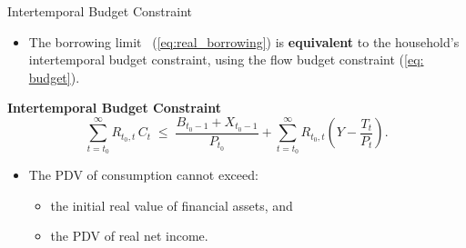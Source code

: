 \documentclass[11pt,aspectratio=169]{beamer}
\begin{document}
\begin{frame}[label=borrowing]{Intertemporal Budget Constraint}


\begin{itemize}
  \item The borrowing limit ~(\ref{eq:real_borrowing}) is \textbf{equivalent} to the household’s intertemporal budget constraint, using the flow budget constraint (\ref{eq: budget}).
\end{itemize}

\vspace{0.25cm}
\noindent\textbf{Intertemporal Budget Constraint}
\begin{equation}
\sum_{t=t_{0}}^{\infty} R_{t_{0},t}\,C_{t}
\;\leq\;
\frac{B_{t_{0}-1}+X_{t_{0}-1}}{P_{t_{0}}}
+\sum_{t=t_{0}}^{\infty} R_{t_{0},t}\!\left(Y - \frac{T_{t}}{P_{t}}\right).
\label{eq:borrowing}
\end{equation}

\begin{itemize}
  \item The PDV of consumption cannot exceed:
  \begin{itemize}
    \item the initial real value of financial assets, and
    \item the PDV of real net income.
  \end{itemize}
\end{itemize}

\vspace{0.3cm}
\begin{center}
  \hyperlink{borrowing_proof}{}
\end{center}

\end{frame}
\end{document}

